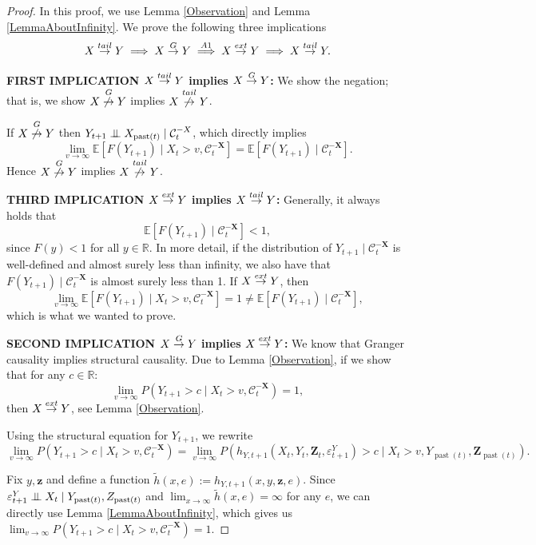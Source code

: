 \documentclass[a4paper,11pt]{article}
\newcommand{\indep}{\perp\kern-5.5pt\perp}
\newcommand{\toverset}[2]{\overset{{\rm #1}}{#2}}
\DeclareMathOperator{\past}{past}
\begin{document}
\begin{proof}
In this proof, we use Lemma \ref{Observation} and Lemma \ref{LemmaAboutInfinity}. 
We prove the following three implications  
\begin{equation*}
    X\toverset{tail}{\to}Y\implies X\toverset{G}{\to}Y \overset{A1}{\implies}X\toverset{ext}{\to}Y\implies X\toverset{tail}{\to}Y.
\end{equation*}

\textbf{FIRST IMPLICATION $X\toverset{tail}{\to}Y$ implies $X\toverset{G}{\to}Y$:} 
We show the negation; that is, we show $X\toverset{G}{\not\to}Y$ implies $X\toverset{tail}{\not\to}Y$.  

If $X\toverset{G}{\not\to}Y$ then $Y_{t+1} \indep X_{\past(t)}\mid \mathcal{C}^{-\textbf{X}}_{t}$, which directly implies
\[
\lim_{v\to\infty} \mathbb{E}[ F(Y_{t+1})\mid X_t>v,\mathcal{C}^{-\textbf{X}}_t]=\mathbb{E}[ F(Y_{t+1})\mid  \mathcal{C}^{-\textbf{X}}_t].
\]
Hence $X\toverset{G}{\not\to}Y$ implies $X\toverset{tail}{\not\to}Y$. 

\textbf{THIRD IMPLICATION $X\toverset{ext}{\to}Y$ implies $X\toverset{tail}{\to}Y$:} 
Generally, it always holds that 
\[
\mathbb{E}[ F(Y_{t+1})\mid  \mathcal{C}^{-\textbf{X}}_t] < 1,
\]
since $F(y) < 1$ for all $y \in \mathbb{R}$. In more detail, if the distribution of $Y_{t+1} \mid \mathcal{C}^{-\textbf{X}}_t$ is well-defined and almost surely less than infinity, we also have that $F(Y_{t+1}) \mid \mathcal{C}^{-\textbf{X}}_t$ is almost surely less than 1. 
If $X\toverset{ext}{\to}Y$,  then
\[
\lim_{v\to\infty} \mathbb{E}[ F(Y_{t+1})\mid X_t>v,\mathcal{C}^{-\textbf{X}}_t] = 1 \neq \mathbb{E}[ F(Y_{t+1})\mid  \mathcal{C}^{-\textbf{X}}_t],
\]
which is what we wanted to prove. 

\textbf{SECOND IMPLICATION $X\toverset{G}{\to}Y$ implies $X\toverset{ext}{\to}Y$:}
We know that Granger causality implies structural causality. Due to  Lemma \ref{Observation}, if we show that for any $c \in \mathbb{R}$:
\begin{equation*}
 \lim_{v\to\infty}P(Y_{t+1} > c \mid X_t > v, \mathcal{C}^{-\textbf{X}}_t) = 1,   
\end{equation*}
then $X\toverset{ext}{\to}Y$, see Lemma \ref{Observation}. 


Using the structural equation for $Y_{t+1}$, we rewrite
\[
\lim_{v\to\infty} P(Y_{t+1} > c \mid X_t > v, \mathcal{C}^{-\textbf{X}}_t) = \lim_{v\to\infty} P(h_{Y,t+1}(X_t, Y_t, \textbf{Z}_t, \varepsilon^Y_{t+1}) > c \mid X_t > v, Y_{\past(t)}, \textbf{Z}_{\past(t)}).
\]

Fix $y, \textbf{z}$ and define a function $\tilde{h}(x,e) := h_{Y,t+1}(x, y, \textbf{z}, e)$. Since $\varepsilon^Y_{t+1} \indep X_t \mid Y_{\past(t)}, \textbf{Z}_{\past(t)}$ and $\lim_{x\to\infty}\tilde{h}(x,e) = \infty$ for any $e$, we can directly use Lemma \ref{LemmaAboutInfinity}, which gives us $\lim_{v\to\infty}P(Y_{t+1} > c \mid X_t > v, \mathcal{C}^{-\textbf{X}}_t) = 1$. 
\end{proof}
\end{document}
